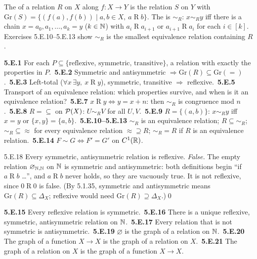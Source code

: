 
\begin{key}
The  of a relation $R$ on $X$ along $f:X\to Y$ is the relation $S$ on $Y$ with $\mathrm{Gr}(S)=\{(f(a),f(b))\mid a,b\in X,\ a\mathrel Rb\}$. The  is $\sim_R$: $x\sim_Ry$ iff there is a chain $x=a_0,a_1,\dots,a_k=y$ ($k\in\mathbb{N}$) with $a_i\mathrel Ra_{i+1}$ or $a_{i+1}\mathrel Ra_i$ for each $i\in[k]$. Exercises 5.E.10--5.E.13 show $\sim_R$ is the smallest equivalence relation containing $R$.
\end{key}

\begin{trybox}[{5.E.1--5.E.3, 5.E.5, 5.E.7--5.E.14 \fO}]
\textbf{5.E.1} For each $P\subseteq\{\text{reflexive, symmetric, transitive}\}$, a relation with exactly the properties in $P$.\ \textbf{5.E.2} Symmetric and antisymmetric $\Rightarrow\mathrm{Gr}(R)\subseteq\mathrm{Gr}(=)$.\ \textbf{5.E.3} Left-total ($\forall x\,\exists y,\ x\mathrel Ry$), symmetric, transitive $\Rightarrow$ reflexive.\ \textbf{5.E.5} Transport of an equivalence relation: which properties survive, and when is it an equivalence relation?\ \textbf{5.E.7} $x\mathrel Ry\Leftrightarrow y=x+n$: then $\sim_R$ is congruence mod $n$.\ \textbf{5.E.8} $R=\subseteq$ on $\mathcal{P}(X)$: $U\sim_RV$ for all $U,V$.\ \textbf{5.E.9} $R=\{(a,b)\}$: $x\sim_Ry$ iff $x=y$ or $\{x,y\}=\{a,b\}$.\ \textbf{5.E.10--5.E.13} $\sim_R$ is an equivalence relation; $R\subseteq\sim_R$; $\sim_R\subseteq\approx$ for every equivalence relation $\approx\supseteq R$; $\sim_R=R$ if $R$ is an equivalence relation.\ \textbf{5.E.14} $F\sim G\Leftrightarrow F'=G'$ on $C^1(\mathbb{R})$.
\end{trybox}

\begin{bookex}[essential]{5.E.18}
Every symmetric, antisymmetric relation is reflexive.
\solution
\emph{False.} The empty relation $\varnothing_{\mathbb{N},\mathbb{N}}$ on $\mathbb{N}$ is symmetric and antisymmetric: both definitions begin ``if $a\mathrel Rb$ \dots'', and $a\mathrel Rb$ never holds, so they are vacuously true. It is not reflexive, since $0\mathrel R0$ is false. (By 5.1.35, symmetric and antisymmetric means $\mathrm{Gr}(R)\subseteq\Delta_X$; reflexive would need $\mathrm{Gr}(R)\supseteq\Delta_X$.)\qed
\end{bookex}

\begin{trybox}[{5.E.15--5.E.17, 5.E.19--5.E.21 \fO}]
\textbf{5.E.15} Every reflexive relation is symmetric.\ \textbf{5.E.16} There is a unique reflexive, symmetric, antisymmetric relation on $\mathbb{N}$.\ \textbf{5.E.17} Every relation that is not symmetric is antisymmetric.\ \textbf{5.E.19} $\varnothing$ is the graph of a relation on $\mathbb{N}$.\ \textbf{5.E.20} The graph of a function $X\to X$ is the graph of a relation on $X$.\ \textbf{5.E.21} The graph of a relation on $X$ is the graph of a function $X\to X$.
\end{trybox}

